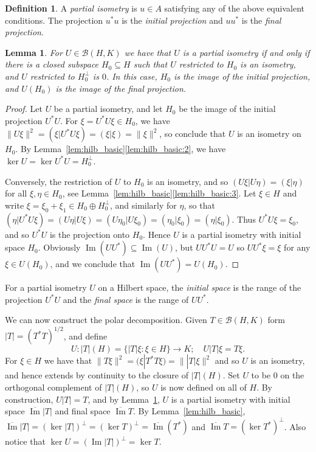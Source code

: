 \documentclass[twoside,a4paper,12pt]{article}
\theoremstyle{plain}
\newtheorem{lemma}[proposition]{Lemma}
\theoremstyle{definition}
\newtheorem{definition}[proposition]{Definition}
\newcommand{\mc}{\mathcal}
\newcommand{\im}{\operatorname{Im}}
\begin{document}
\begin{definition}
A \emph{partial isometry} is $u\in A$ satisfying any of the above equivalent conditions.  The projection $u^*u$ is the \emph{initial projection} and $uu^*$ is the \emph{final projection}.
\end{definition}

\begin{lemma}\label{lem:pi_hilbsp}
For $U\in\mc B(H,K)$ we have that $U$ is a partial isometry if and only if there is a closed subspace $H_0\subseteq H$ such that $U$ restricted to $H_0$ is an isometry, and $U$ restricted to $H_0^\perp$ is $0$.  In this case, $H_0$ is the image of the initial projection, and $U(H_0)$ is the image of the final projection.
\end{lemma}
\begin{proof}
Let $U$ be a partial isometry, and let $H_0$ be the image of the initial projection $U^*U$.  For $\xi = U^*U\xi \in H_0$, we have $\|U\xi\|^2 = (\xi|U^*U\xi) = (\xi|\xi) = \|\xi\|^2$, so conclude that $U$ is an isometry on $H_0$.  By Lemma~\ref{lem:hilb_basic}\ref{lem:hilb_basic:2}, we have $\ker U = \ker U^*U = H_0^\perp$.

Conversely, the restriction of $U$ to $H_0$ is an isometry, and so $(U\xi|U\eta) = (\xi|\eta)$ for all $\xi,\eta\in H_0$, see Lemma~\ref{lem:hilb_basic}\ref{lem:hilb_basic:3}.  Let $\xi\in H$ and write $\xi = \xi_0 + \xi_1 \in H_0 \oplus H_0^\perp$, and similarly for $\eta$, so that $(\eta|U^*U\xi) = (U\eta|U\xi) = (U\eta_0|U\xi_0) = (\eta_0|\xi_0) = (\eta|\xi_0)$.  Thus $U^*U\xi = \xi_0$, and so $U^*U$ is the projection onto $H_0$.  Hence $U$ is a partial isometry with initial space $H_0$.  Obviously $\im(UU^*) \subseteq \im(U)$, but $UU^*U = U$ so $UU^*\xi=\xi$ for any $\xi\in U(H_0)$, and we conclude that $\im(UU^*) = U(H_0)$.
\end{proof}

For a partial isometry $U$ on a Hilbert space, the \emph{initial space} is the range of the projection $U^*U$ and the \emph{final space} is the range of $UU^*$.

We can now construct the polar decomposition.  Given $T\in\mc B(H,K)$ form $|T|=(T^*T)^{1/2}$, and define
\[ U \colon |T|(H) = \{ |T|\xi : \xi\in H\} \to K; \quad
U |T|\xi = T\xi. \]
For $\xi\in H$ we have that $\|T\xi\|^2 = (\xi|T^*T\xi) = \| |T|\xi\|^2$ and so $U$ is an isometry, and hence extends by continuity to the closure of $|T|(H)$.  Set $U$ to be $0$ on the orthogonal complement of $|T|(H)$, so $U$ is now defined on all of $H$.  By construction, $U|T|= T$, and by Lemma~\ref{lem:pi_hilbsp}, $U$ is a partial isometry with initial space $\overline{\im}|T|$ and final space $\overline{\im}T$.  By Lemma~\ref{lem:hilb_basic}, $\overline{\im}|T| = (\ker |T|)^\perp = (\ker T)^\perp = \overline{\im}(T^*)$ and $\overline{\im}T = (\ker T^*)^\perp$.  Also notice that $\ker U = (\im |T|)^\perp = \ker T$.
\end{document}
